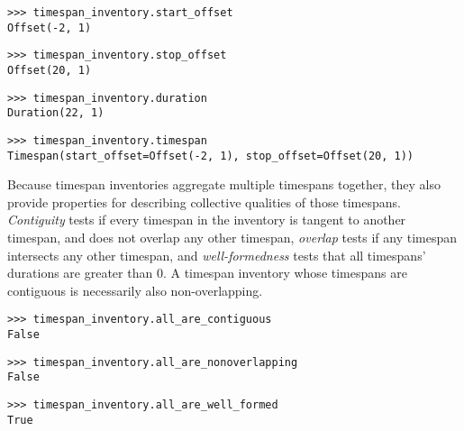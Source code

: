 \begin{comment}
<abjad>
timespan_inventory.start_offset
timespan_inventory.stop_offset
timespan_inventory.duration
timespan_inventory.timespan
</abjad>
\end{comment}

\begin{singlespacing}
\vspace{-0.5\baselineskip}
\begin{lstlisting}
>>> timespan_inventory.start_offset
Offset(-2, 1)
\end{lstlisting}
\begin{lstlisting}
>>> timespan_inventory.stop_offset
Offset(20, 1)
\end{lstlisting}
\begin{lstlisting}
>>> timespan_inventory.duration
Duration(22, 1)
\end{lstlisting}
\begin{lstlisting}
>>> timespan_inventory.timespan
Timespan(start_offset=Offset(-2, 1), stop_offset=Offset(20, 1))
\end{lstlisting}
\end{singlespacing}

\noindent Because timespan inventories aggregate multiple timespans together,
they also provide properties for describing collective qualities of those
timespans. \emph{Contiguity} tests if every timespan in the inventory is
tangent to another timespan, and does not overlap any other timespan,
\emph{overlap} tests if any timespan intersects any other timespan, and
\emph{well-formedness} tests that all timespans' durations are greater than 0.
A timespan inventory whose timespans are contiguous is necessarily
also non-overlapping.

\begin{comment}
<abjad>
timespan_inventory.all_are_contiguous
timespan_inventory.all_are_nonoverlapping
timespan_inventory.all_are_well_formed
</abjad>
\end{comment}

\begin{singlespacing}
\vspace{-0.5\baselineskip}
\begin{lstlisting}
>>> timespan_inventory.all_are_contiguous
False
\end{lstlisting}
\begin{lstlisting}
>>> timespan_inventory.all_are_nonoverlapping
False
\end{lstlisting}
\begin{lstlisting}
>>> timespan_inventory.all_are_well_formed
True
\end{lstlisting}
\end{singlespacing}

